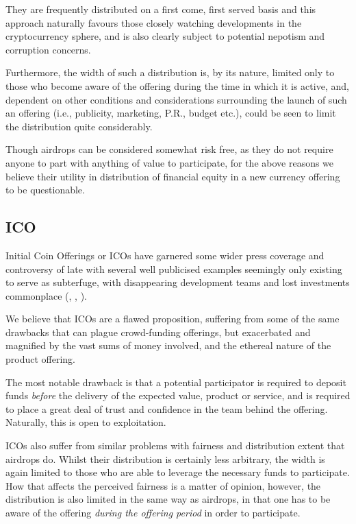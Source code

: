 \documentclass{IOS-Book-Article}
\begin{document}
They are frequently distributed on a first come, first served basis and this approach 
naturally favours those closely watching developments in the cryptocurrency sphere, 
and is also clearly subject to potential nepotism and corruption concerns. 

Furthermore, the width of such a distribution is, by its nature, limited only to those
who become aware of the offering during the time in which it is active, and, dependent
on other conditions and considerations surrounding the launch of such an offering (i.e., publicity,
marketing, P.R., budget etc.), could be seen to limit the distribution quite considerably.

Though airdrops can be considered somewhat risk free, as they do not require anyone
to part with anything of value to participate, for the above reasons we believe their
utility in distribution of financial equity in a new currency offering to be questionable.

\subsection{ICO}
Initial Coin Offerings or ICOs have garnered some wider press coverage
and controversy of late with several well publicised examples seemingly only
existing to serve as subterfuge, with disappearing development teams and
lost investments commonplace (\cite{r3}, \cite{r4}, \cite{r5}).

We believe that ICOs are a flawed proposition, suffering from some of the same
drawbacks that can plague crowd-funding offerings, but exacerbated and magnified
by the vast sums of money involved, and the ethereal nature of the product
offering.

The most notable drawback is that a potential participator is required
to deposit funds \textit{before} the delivery of the expected value, product or 
service, and is required to place a great deal of trust and confidence in the team behind the 
offering. Naturally, this is open to exploitation. 

ICOs also suffer from similar problems with fairness and distribution extent
that airdrops do. Whilst their distribution is certainly less arbitrary, the width
is again limited to those who are able to leverage the necessary funds to participate.
How that affects the perceived fairness is a matter of opinion, however, the distribution
is also limited in the same way as airdrops, in that one has to be aware of the offering
\textit{during the offering period} in order to participate.
\end{document}

